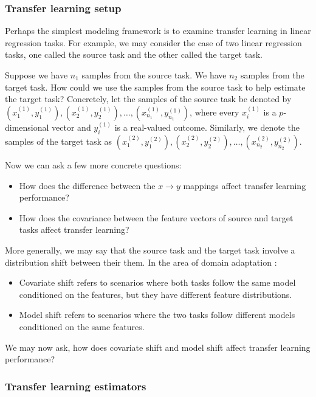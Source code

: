 \subsubsection{Transfer learning setup}

Perhaps the simplest modeling framework is to examine transfer learning in linear regression tasks.
For example, we may consider the case of two linear regression tasks, one called the source task and the other called the target task.

Suppose we have $n_1$ samples from the source task. We have $n_2$ samples from the target task. How could we use the samples from the source task to help estimate the target task?
Concretely, let the samples of the source task be denoted by $(x^{(1)}_1, y^{(1)}_1), (x^{(1)}_2, y^{(1)}_2), \dots, (x^{(1)}_{n_1}, y^{(1)}_{n_1})$, where every $x^{(1)}_i$ is a $p$-dimensional vector and $y^{(1)}_i$ is a real-valued outcome.
Similarly, we denote the samples of the target task as $(x^{(2)}_1, y^{(2)}_1), (x^{(2)}_2, y^{(2)}_2), \dots, (x^{(2)}_{n_2}, y^{(2)}_{n_2})$.

Now we can ask a few more concrete questions:
\begin{itemize}
    \item How does the difference between the $x \rightarrow y$ mappings affect transfer learning performance?

    \item How does the covariance between the feature vectors of source and target tasks affect transfer learning?
\end{itemize}
More generally, we may say that the source task and the target task involve a distribution shift between their them. In the area of domain adaptation \citep{kouw2018introduction}:
\begin{itemize}
    \item Covariate shift refers to scenarios where both tasks follow the same model conditioned on the features, but they have different feature distributions.

    \item Model shift refers to scenarios where the two tasks follow different models conditioned on the same features. %
\end{itemize}
We may now ask, how does covariate shift and model shift affect transfer learning performance?

\subsubsection{Transfer learning estimators}

